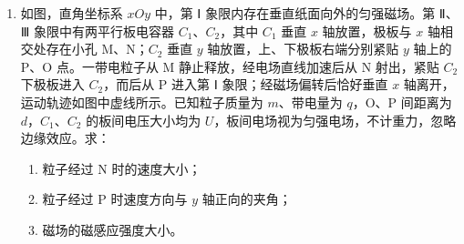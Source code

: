 \documentclass[\gkver]{gaokaozhenti}
\begin{document}
\begin{enumerate}
{（3）根据功率的定义 $P = \frac{W}{t}$，有 $P = 600 \UW$。
}

\item
如图，直角坐标系 $xOy$ 中，第 Ⅰ 象限内存在垂直纸面向外的匀强磁场。第 Ⅱ、Ⅲ 象限中有两平行板电容器 $C_{1}$、$C_{2}$，其中 $C_{1}$ 垂直 $x$ 轴放置，极板与 $x$ 轴相交处存在小孔 M、N；$C_{2}$ 垂直 $y$ 轴放置，上、下极板右端分别紧贴 $y$ 轴上的 P、O 点。一带电粒子从 M 静止释放，经电场直线加速后从 N 射出，紧贴 $C_{2}$ 下极板进入 $C_{2}$，而后从 P 进入第 Ⅰ 象限；经磁场偏转后恰好垂直 $x$ 轴离开，运动轨迹如图中虚线所示。已知粒子质量为 $m$、带电量为 $q$，O、P 间距离为 $d$，$C_{1}$、$C_{2}$ 的板间电压大小均为 $U$，板间电场视为匀强电场，不计重力，忽略边缘效应。求：
\begin{enumerate}
	\item
	粒子经过 N 时的速度大小；
	\item
	粒子经过 P 时速度方向与 $y$ 轴正向的夹角；
	\item
	磁场的磁感应强度大小。
\end{enumerate}

\end{enumerate}
\end{document}
